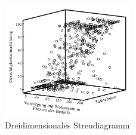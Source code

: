 \documentclass[a4paper]{thesis}
\begin{document}
\begin{figure}[H]
\centering
\includegraphics[width=0.5\textwidth]{figures/streu_3d.png}
\caption[Dreidimensionales Streudiagramm]{Dreidimensionales Streudiagramm}
\end{figure}
\end{document}
